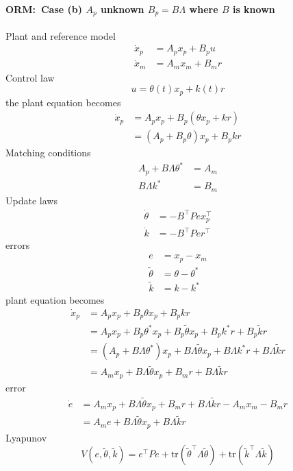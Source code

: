 \paragraph*{ORM:\ Case (b) $A_{p}$ unknown $B_{p}=B\Lambda$ where $B$ is known}
Plant and reference model
\begin{align*}
  \dot{x}_{p}&=A_{p}x_{p}+B_{p}u \\
  \dot{x}_{m}&=A_{m}x_{m}+B_{m}r
\end{align*}
Control law
\begin{equation*}
  u=\theta(t)x_{p}+k(t)r
\end{equation*}
the plant equation becomes
\begin{align*}
  \dot{x}_{p}&=A_{p}x_{p}+B_{p}\left(\theta x_{p}+kr\right) \\
  &=\left(A_{p}+B_{p}\theta\right)x_{p}+B_{p}kr
\end{align*}
Matching conditions
\begin{align*}
  A_{p}+B\Lambda\theta^{*}&=A_{m} \\
  B\Lambda k^{*}&=B_{m}
\end{align*}
Update laws
\begin{align*}
  \dot{\theta}&=-B^{\top}Pex_{p}^{\top} \\
  \dot{k}&=-B^{\top}Per^{\top}
\end{align*}
errors
\begin{align*}
  e&=x_{p}-x_{m} \\
  \tilde{\theta}&=\theta-\theta^{*} \\
  \tilde{k}&=k-k^{*}
\end{align*}
plant equation becomes
\begin{align*}
  \dot{x}_{p}&=A_{p}x_{p}+B_{p}\theta x_{p}+B_{p}kr \\
  &=A_{p}x_{p}+B_{p}\theta^{*}x_{p}+B_{p}\tilde{\theta}x_{p}+B_{p}k^{*}r+B_{p}\tilde{k}r \\
  &=(A_{p}+B\Lambda\theta^{*})x_{p}+B\Lambda\tilde{\theta}x_{p}+B\Lambda k^{*}r+B\Lambda\tilde{k}r \\
  &=A_{m}x_{p}+B\Lambda\tilde{\theta}x_{p}+B_{m}r+B\Lambda\tilde{k}r
\end{align*}
error
\begin{align*}
  \dot{e}&=A_{m}x_{p}+B\Lambda\tilde{\theta}x_{p}+B_{m}r+B\Lambda\tilde{k}r-A_{m}x_{m}-B_{m}r \\
  &=A_{m}e+B\Lambda\tilde{\theta}x_{p}+B\Lambda\tilde{k}r
\end{align*}
Lyapunov
\begin{equation*}
  V(e,\tilde{\theta},\tilde{k})=
  e^{\top}Pe+\text{tr}\left(\tilde{\theta}^{\top}\Lambda\tilde{\theta}\right)+\text{tr}\left(\tilde{k}^{\top}\Lambda\tilde{k}\right)
\end{equation*}
